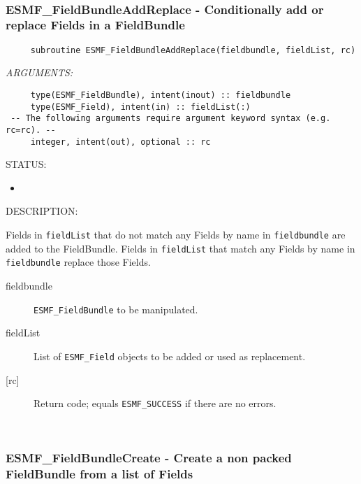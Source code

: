 
\mbox{}\hrulefill\ 
 
\subsubsection [ESMF\_FieldBundleAddReplace] {ESMF\_FieldBundleAddReplace - Conditionally add or replace Fields in a FieldBundle}


  
\begin{verbatim}     subroutine ESMF_FieldBundleAddReplace(fieldbundle, fieldList, rc)\end{verbatim}{\em ARGUMENTS:}
\begin{verbatim}     type(ESMF_FieldBundle), intent(inout) :: fieldbundle
     type(ESMF_Field), intent(in) :: fieldList(:)
 -- The following arguments require argument keyword syntax (e.g. rc=rc). --
     integer, intent(out), optional :: rc\end{verbatim}
{\sf STATUS:}
   \begin{itemize}
   \item{}
   \end{itemize}
  
{\sf DESCRIPTION:\\ }


   Fields in {\tt fieldList} that do not match any Fields by name in
   {\tt fieldbundle} are added to the FieldBundle. Fields in {\tt fieldList}
   that match any Fields by name in {\tt fieldbundle} replace those Fields.
  
   \begin{description}
   \item [fieldbundle]
   {\tt ESMF\_FieldBundle} to be manipulated.
   \item [fieldList]
   List of {\tt ESMF\_Field} objects to be added or used as replacement.
   \item [{[rc]}]
   Return code; equals {\tt ESMF\_SUCCESS} if there are no errors.
   \end{description}
   
 
\mbox{}\hrulefill\ 
 
\subsubsection [ESMF\_FieldBundleCreate] {ESMF\_FieldBundleCreate - Create a non packed FieldBundle from a list of Fields}


